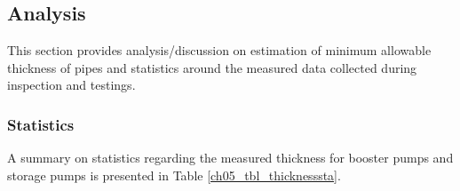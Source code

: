 
\subsection{Analysis} 
This section provides analysis/discussion on estimation of minimum allowable thickness of pipes and statistics around the measured data collected during inspection and testings.

\subsubsection{Statistics} \label{ch05_statistics}
A summary on statistics regarding the measured thickness for booster pumps and storage pumps is presented in Table \ref{ch05_tbl_thicknesssta}.
